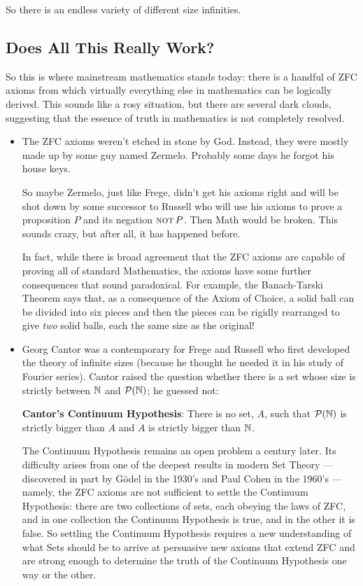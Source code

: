 So there is an endless variety of different size infinities.

\subsection{Does All This Really Work?}

So this is where mainstream mathematics stands today: there is a handful
of ZFC axioms from which virtually everything else in mathematics can be
logically derived.  This sounds like a rosy situation, but there are
several dark clouds, suggesting that the essence of truth in mathematics
is not completely resolved.

%
\begin{itemize}

\item The ZFC axioms weren't etched in stone by God.  Instead, they were
  mostly made up by some guy named Zermelo.  Probably some days he forgot
  his house keys.

  So maybe Zermelo, just like Frege, didn't get his axioms right and will
  be shot down by some successor to Russell who will use his axioms to
  prove a proposition $P$ and its negation $\mathop{\mathrm{\textsc{not}}} P$.  Then Math would be
  broken.  This sounds crazy, but after all, it has happened before.

  In fact, while there is broad agreement that the ZFC axioms are capable
  of proving all of standard Mathematics, the axioms have some further
  consequences that sound paradoxical.  For example, the Banach-Tarski
  Theorem says that, as a consequence of the Axiom of Choice, a solid ball
  can be divided into six pieces and then the pieces can be rigidly
  rearranged to give \textit{two} solid balls, each the same size as the
  original!

\item Georg Cantor was a contemporary for Frege and Russell who first
  developed the theory of infinite sizes (because he thought he needed it
  in his study of Fourier series).  Cantor raised the question whether
  there is a set whose size is strictly between $\mathbb{N}$ and
  $\mathcal{P}(\mathbb{N})$; he guessed not:

\textbf{Cantor's Continuum Hypothesis}: There is no set, $A$, such that
$\mathcal{P}(\mathbb{N})$ is strictly bigger than $A$ and $A$ is strictly bigger
than $\mathbb{N}$.

The Continuum Hypothesis remains an open problem a century later.  Its
difficulty arises from one of the deepest results in modern Set Theory
---discovered in part by G\"odel in the 1930's and Paul Cohen in the
1960's ---namely, the ZFC axioms are not sufficient to settle the
Continuum Hypothesis: there are two collections of sets, each obeying the
laws of ZFC, and in one collection the Continuum Hypothesis is true, and
in the other it is false.  So settling the Continuum Hypothesis requires a
new understanding of what Sets should be to arrive at persuasive new
axioms that extend ZFC and are strong enough to determine the truth of the
Continuum Hypothesis one way or the other.


\end{itemize}
